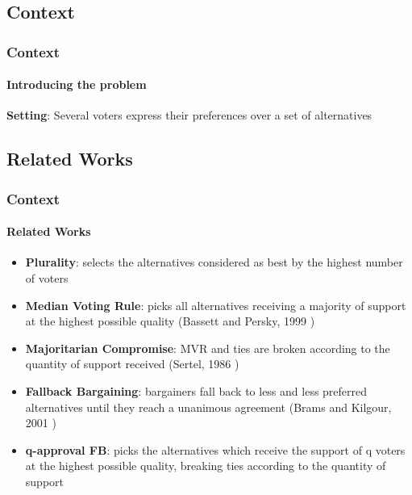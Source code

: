 \documentclass{beamer}
\begin{document}
\subsection{Context}
\begin{frame}
	\frametitle{Context}
	\framesubtitle{Introducing the problem}
	\textbf{Setting}: Several voters express their preferences over a set of alternatives \vspace{6mm}
	
\end{frame}

\subsection{Related Works}
\begin{frame}
	\frametitle{Context}
	\framesubtitle{Related Works}
	\begin{itemize}
		\item<1-> \textbf{Plurality}: selects the alternatives considered as best by the highest number of voters 
		\item<2-> \textbf{Median Voting Rule}: picks all alternatives receiving a majority of support at the highest possible quality (Bassett and Persky, 1999 \cite{Bassett1999})
		\item<3-> \textbf{Majoritarian Compromise}: MVR and ties are broken according to the quantity of support received (Sertel, 1986 \cite{Sertel1986})
		\item<4-> \textbf{Fallback Bargaining}: bargainers fall back to less and less preferred alternatives until they reach a unanimous agreement (Brams and Kilgour, 2001 \cite{Brams2001})
		\item<5-> \textbf{q-approval FB}: picks the alternatives which receive the support of q voters at the highest possible quality, breaking ties according to the quantity of support
	\end{itemize}
\end{frame}
\end{document}

